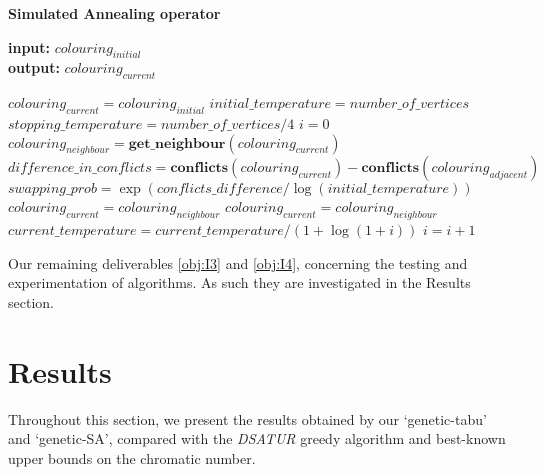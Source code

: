 \documentclass[12pt,a4paper]{article}
\begin{document}
\begin{algorithm}
  \caption*{\textbf{Simulated Annealing operator}}
  \textbf{input:} $colouring_{initial}$\\
  \textbf{output:} $colouring_{current}$
  \begin{algorithmic}[1]
  	\State $colouring_{current} = colouring_{initial}$
  	\State $initial\_temperature = number\_of\_vertices$
  	\State $stopping\_temperature = number\_of\_vertices/4$
  	\State $i = 0$
  	\State $colouring_{neighbour} = \textbf{get\_neighbour}(colouring_{current})$
  	\State $difference\_in\_conflicts = \textbf{conflicts}(colouring_{current}) - \textbf{conflicts}(colouring_{adjacent})$
  	\State $swapping\_prob = \exp(conflicts\_difference/\log(initial\_temperature))$
  	\State $colouring_{current} = colouring_{neighbour}$
  	\State $colouring_{current} = colouring_{neighbour}$
  	\EndIf
  	\State $current\_temperature = current\_temperature/(1 + \log(1 + i))$
  	\State $i = i + 1$
  	\EndWhile
  \end{algorithmic}
\end{algorithm} 
\par Our remaining deliverables \ref{obj:I3} and \ref{obj:I4}, concerning the testing and experimentation of algorithms. As such they are investigated in the Results section.
\section{Results} 
\par Throughout this section, we present the results obtained by our `genetic-tabu' and `genetic-SA', compared with the \textit{DSATUR} greedy algorithm and best-known upper bounds on the chromatic number.
\end{document}

